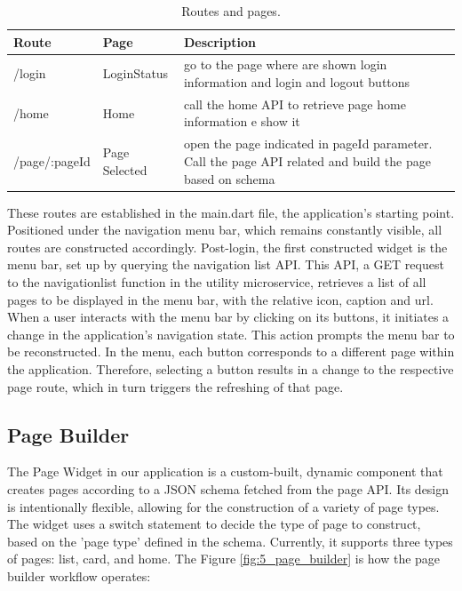 \begin{table}
    \centering
    \begin{tabular}{|l|l|m{7cm}|}
        \hline
        \textbf{Route} & \textbf{Page} & \textbf{Description}                                                                                      \\ \hline
        /login         & LoginStatus   & go to the page where are shown login information and login and logout buttons                             \\ \hline
        /home          & Home          & call the home API to retrieve page home information e show it                                             \\ \hline
        /page/:pageId  & Page Selected & open the page indicated in pageId parameter. Call the page API related and build the page based on schema \\ \hline
    \end{tabular}
    \caption{Routes and pages.}
    \label{tab:5_routes}
\end{table}

These routes are established in the main.dart file, the application's starting point. Positioned
under the navigation menu bar, which remains constantly visible, all routes are constructed
accordingly. Post-login, the first constructed widget is the menu bar, set up by querying the
navigation list API. This API, a GET request to the navigationlist function in the utility
microservice, retrieves a list of all pages to be displayed in the menu bar, with the relative icon,
caption and url. When a user interacts with the menu bar by clicking on its buttons, it initiates a
change in the application's navigation state. This action prompts the menu bar to be reconstructed.
In the menu, each button corresponds to a different page within the application. Therefore,
selecting a button results in a change to the respective page route, which in turn triggers the
refreshing of that page.

\subsection{Page Builder}
The Page Widget in our application is a custom-built, dynamic component that creates pages according
to a JSON schema fetched from the page API. Its design is intentionally flexible, allowing for the
construction of a variety of page types. The widget uses a switch statement to decide the type of
page to construct, based on the 'page type' defined in the schema. Currently, it supports three
types of pages: list, card, and home. The Figure \ref{fig:5_page_builder} is how the page builder
workflow operates:

